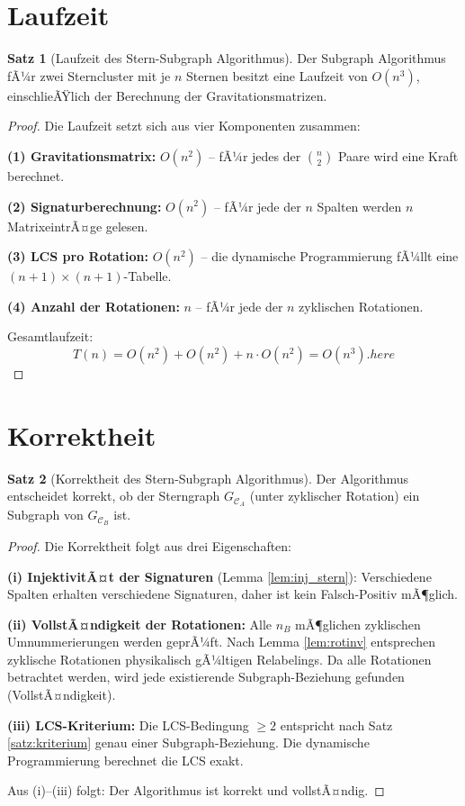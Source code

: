 ﻿\documentclass[a4paper,12pt]{report}
\theoremstyle{definition}
\newtheorem{satz}{Satz}
\begin{document}
\section{Laufzeit}

\begin{satz}[Laufzeit des Stern-Subgraph Algorithmus]
\label{satz:laufzeit}
Der Subgraph Algorithmus fÃ¼r zwei Sterncluster mit je $n$ Sternen besitzt eine Laufzeit von $O(n^3)$, einschlieÃŸlich der Berechnung der Gravitationsmatrizen.
\end{satz}

\begin{proof}
Die Laufzeit setzt sich aus vier Komponenten zusammen:

\textbf{(1) Gravitationsmatrix:} $O(n^2)$ -- fÃ¼r jedes der $\binom{n}{2}$ Paare wird eine Kraft berechnet.

\textbf{(2) Signaturberechnung:} $O(n^2)$ -- fÃ¼r jede der $n$ Spalten werden $n$ MatrixeintrÃ¤ge gelesen.

\textbf{(3) LCS pro Rotation:} $O(n^2)$ -- die dynamische Programmierung fÃ¼llt eine $(n+1) \times (n+1)$-Tabelle.

\textbf{(4) Anzahl der Rotationen:} $n$ -- fÃ¼r jede der $n$ zyklischen Rotationen.

Gesamtlaufzeit:
\[
T(n) = O(n^2) + O(n^2) + n \cdot O(n^2) = O(n^3).here
\]
\end{proof}

\section{Korrektheit}

\begin{satz}[Korrektheit des Stern-Subgraph Algorithmus]
\label{satz:korrekt}
Der Algorithmus entscheidet korrekt, ob der Sterngraph $G_{\mathcal{C}_A}$ (unter zyklischer Rotation) ein Subgraph von $G_{\mathcal{C}_B}$ ist.
\end{satz}

\begin{proof}
Die Korrektheit folgt aus drei Eigenschaften:

\textbf{(i) InjektivitÃ¤t der Signaturen} (Lemma \ref{lem:inj_stern}): Verschiedene Spalten erhalten verschiedene Signaturen, daher ist kein Falsch-Positiv mÃ¶glich.

\textbf{(ii) VollstÃ¤ndigkeit der Rotationen:} Alle $n_B$ mÃ¶glichen zyklischen Umnummerierungen werden geprÃ¼ft. Nach Lemma \ref{lem:rotinv} entsprechen zyklische Rotationen physikalisch gÃ¼ltigen Relabelings. Da alle Rotationen betrachtet werden, wird jede existierende Subgraph-Beziehung gefunden (VollstÃ¤ndigkeit).

\textbf{(iii) LCS-Kriterium:} Die LCS-Bedingung $\geq 2$ entspricht nach Satz \ref{satz:kriterium} genau einer Subgraph-Beziehung. Die dynamische Programmierung berechnet die LCS exakt.

Aus (i)--(iii) folgt: Der Algorithmus ist korrekt und vollstÃ¤ndig.
\end{proof}
\end{document}
